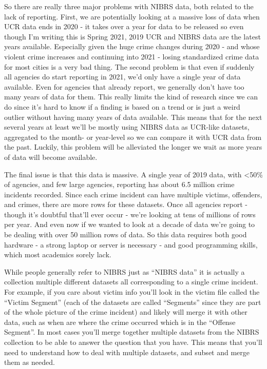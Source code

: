 \documentclass[
  12pt,
  openany]{book}
\begin{document}
So there are really three major problems with NIBRS data, both related to the lack of reporting. First, we are potentially looking at a massive loss of data when UCR data ends in 2020 - it takes over a year for data to be released so even though I'm writing this is Spring 2021, 2019 UCR and NIBRS data are the latest years available. Especially given the huge crime changes during 2020 - and whose violent crime increases and continuing into 2021 - losing standardized crime data for most cities is a very bad thing. The second problem is that even if suddenly all agencies do start reporting in 2021, we'd only have a single year of data available. Even for agencies that already report, we generally don't have too many years of data for them. This really limits the kind of research since we can do since it's hard to know if a finding is based on a trend or is just a weird outlier without having many years of data available. This means that for the next several years at least we'll be mostly using NIBRS data as UCR-like datasets, aggregated to the month- or year-level so we can compare it with UCR data from the past. Luckily, this problem will be alleviated the longer we wait as more years of data will become available.

The final issue is that this data is massive. A single year of 2019 data, with \textless50\% of agencies, and few large agencies, reporting has about 6.5 million crime incidents recorded. Since each crime incident can have multiple victims, offenders, and crimes, there are more rows for these datasets. Once all agencies report - though it's doubtful that'll ever occur - we're looking at tens of millions of rows per year. And even now if we wanted to look at a decade of data we're going to be dealing with over 50 million rows of data. So this data requires both good hardware - a strong laptop or server is necessary - and good programming skills, which most academics sorely lack.

While people generally refer to NIBRS just as ``NIBRS data'' it is actually a collection multiple different datasets all corresponding to a single crime incident. For example, if you care about victim info you'll look in the victim file called the ``Victim Segment'' (each of the datasets are called ``Segments'' since they are part of the whole picture of the crime incident) and likely will merge it with other data, such as when are where the crime occurred which is in the ``Offense Segment''. In most cases you'll merge together multiple datasets from the NIBRS collection to be able to answer the question that you have. This means that you'll need to understand how to deal with multiple datasets, and subset and merge them as needed.
\end{document}
